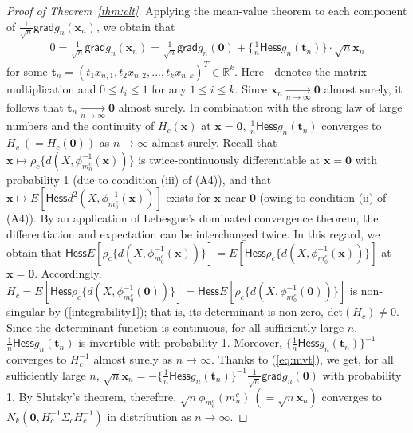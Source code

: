 \documentclass[preprint]{imsart}
\newcommand{\bbR}{\mathbb{R}}
\theoremstyle{plain}
\theoremstyle{remark}
\begin{document}
\begin{appendix}
\begin{proof}[Proof of Theorem~\ref{thm:clt}]
Applying the mean-value theorem to each component of $\frac{1}{\sqrt{n}}\textsf{grad} g_{n}(\mathbf{x}_{n})$, we obtain that
\begin{eqnarray}\label{eq:mvt}
0=\frac{1}{\sqrt{n}}\textsf{grad}g_{n}(\mathbf{x}_{n})=\frac{1}{\sqrt{n}}\textsf{grad}g_{n}(\mathbf{0})+\{\frac{1}{n} \textsf{Hess}g_{n}(\mathbf{t}_{n})\} \cdot \sqrt{n} \mathbf{x}_{n}
\end{eqnarray}
for some $\mathbf{t}_{n}=(t_{1}x_{n,1}, t_{2}x_{n,2}, ..., t_{k}x_{n,k})^{T} \in \bbR^{k}$. Here $\cdot$ denotes the matrix multiplication and $0 \le t_{i} \le 1$ for any $1 \le i \le k$. Since $\mathbf{x}_{n} \underset{n \rightarrow \infty}{\rightarrow} \mathbf{0}$ almost surely, it follows that $\mathbf{t}_{n} \underset{n \rightarrow \infty}{\rightarrow} \mathbf{0}$ almost surely. In combination with the strong law of large numbers and the continuity of $H_{c}(\mathbf{x})$ at $\mathbf{x}=\mathbf{0}$, $\frac{1}{n}\textsf{Hess}g_{n}(\mathbf{t}_{n})$ converges to $H_{c} ~ (=H_{c}(\mathbf{0}))$ as $n \rightarrow \infty$ almost surely. Recall that $\mathbf{x} \mapsto \rho_{c}\{d(X, \phi^{-1}_{m^{c}_{0}}(\mathbf{x}))\}$ is twice-continuously differentiable at $\mathbf{x}=\mathbf{0}$ with probability 1 (due to condition (iii) of (A4)), and that $\mathbf{x} \mapsto E[\textsf{Hess}d^2(X, \phi^{-1}_{m^{c}_{0}}(\mathbf{x}))]$ exists for $\mathbf{x}$ near $\mathbf{0}$ (owing to condition (ii) of (A4)). By an application of Lebesgue's dominated convergence theorem, the differentiation and expectation can be interchanged twice. In this regard, we obtain that $\textsf{Hess}E[\rho_{c}\{d(X, \phi^{-1}_{m^{c}_{0}}(\mathbf{x}))\}]=E[\textsf{Hess}\rho_{c}\{d(X, \phi^{-1}_{m^{c}_{0}}(\mathbf{x}))\}]$ at $\mathbf{x}=\mathbf{0}$. Accordingly,
$H_{c}= E[\textsf{Hess}\rho_{c}\{d(X, \phi^{-1}_{m^{c}_{0}}(\mathbf{0}))\}]=\textsf{Hess}E[\rho_{c}\{d(X, \phi^{-1}_{m^{c}_{0}}(\mathbf{0}))\}]$ is non-singular by (\ref{integrability1}); that is, its determinant is non-zero, $\mbox{det}(H_{c}) \neq 0$. Since the determinant function is continuous, for all sufficiently large $n$, $\frac{1}{n} \textsf{Hess}g_{n}(\mathbf{t}_{n})$ is invertible with probability 1. Moreover, $\{\frac{1}{n} \textsf{Hess}g_{n}(\mathbf{t}_{n})\}^{-1}$ converges to $H^{-1}_{c}$ almost surely as $n \rightarrow \infty$. Thanks to (\ref{eq:mvt}), we get, for all sufficiently large $n$, $\sqrt{n} \mathbf{x}_{n} = -\{\frac{1}{n} \textsf{Hess}g_{n}(\mathbf{t}_{n})\}^{-1} \frac{1}{\sqrt{n}}\textsf{grad} g_{n}(\mathbf{0})$ with probability 1. By Slutsky's theorem, therefore, $\sqrt{n} \phi_{m^{c}_{0}}(m^{c}_{n}) ~ (=\sqrt{n}\mathbf{x}_{n})$ converges to $N_{k}(\mathbf{0}, H_{c}^{-1}\Sigma_{c}H^{-1}_{c})$ in distribution as $n \rightarrow \infty$.
\end{proof}






\end{appendix}
\end{document}
